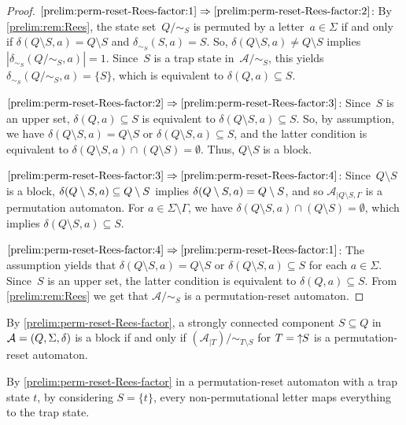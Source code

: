 \begin{proof}
$\ref{prelim:perm-reset-Rees-factor:1} \Rightarrow \ref{prelim:perm-reset-Rees-factor:2}$:
By \cref{prelim:rem:Rees}, the state set~$Q / {\sim_S}$ is permuted by a letter~$a \in \Sigma$
if and only if $\delta(Q \setminus S, a) = Q \setminus S$
and $\delta_{\sim_S}(S, a) = S$.
So, $\delta(Q \setminus S, a) \ne Q \setminus S$
implies $| \delta_{\sim_S}(Q / {\sim_S}, a)| = 1$.
Since~$S$ is a trap state in~$\mathcal A / {\sim_S}$,
this yields $\delta_{\sim_S}(Q / {\sim_S}, a) = \{S\}$,
which is equivalent to $\delta(Q, a) \subseteq S$.

$\ref{prelim:perm-reset-Rees-factor:2} \Rightarrow \ref{prelim:perm-reset-Rees-factor:3}$:
Since~$S$ is an upper set, $\delta(Q, a) \subseteq S$
is equivalent to $\delta(Q \setminus S, a) \subseteq S$.
So, by assumption,
we have $\delta(Q \setminus S, a) = Q \setminus S$
or $\delta(Q \setminus S, a) \subseteq S$,
and the latter condition is equivalent to $\delta(Q \setminus S, a) \cap (Q \setminus S) = \emptyset$.
Thus, $Q \setminus S$ is a block.

$\ref{prelim:perm-reset-Rees-factor:3} \Rightarrow \ref{prelim:perm-reset-Rees-factor:4}$: 
Since~$Q \setminus S$ is a block,
$\delta(Q \setminus S,a) \subseteq Q \setminus S$
implies $\delta(Q \setminus S,a) = Q \setminus S$, and so $\mathcal A_{|Q\setminus S, \Gamma}$
is a permutation automaton. For $a \in \Sigma \setminus \Gamma$, we have $\delta(Q \setminus S, a) \cap (Q \setminus S) = \emptyset$,
which implies $\delta(Q \setminus S, a) \subseteq S$.

$\ref{prelim:perm-reset-Rees-factor:4} \Rightarrow \ref{prelim:perm-reset-Rees-factor:1}$: 
The assumption yields that $\delta(Q \setminus S, a) = Q \setminus S$
or $\delta(Q \setminus S, a) \subseteq S$ for each $a \in \Sigma$.
Since~$S$ is an upper set, the latter condition
is equivalent to $\delta(Q, a) \subseteq S$.
From \cref{prelim:rem:Rees} we get that $\mathcal A / {\sim_S}$
is a permutation-reset automaton.
\end{proof}

\begin{remark}
	By \cref{prelim:perm-reset-Rees-factor},
	a strongly connected component $S \subseteq Q$ in $\mathcal A = (Q, \Sigma, \delta)$
	is a block if and only if $( \mathcal A_{|T} ) / {\sim_{T \setminus S}}$
	for $T = \mbox{\ensuremath{\displaystyle \uparrow \!\!S}}$ is a permutation-reset automaton.	
\end{remark}

By \cref{prelim:perm-reset-Rees-factor} in a permutation-reset automaton
with a trap state $t$, by considering $S = \{t\}$, every non-permutational
letter maps everything to the trap state.

